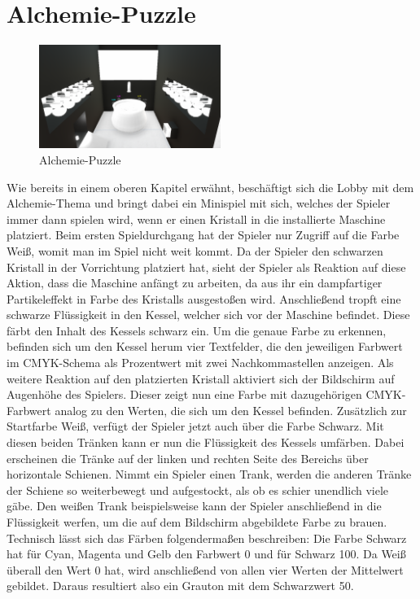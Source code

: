 \section{Alchemie-Puzzle}
\begin{figure}
	\vspace*{-0.5cm}
	\includegraphics[width=5.9cm]{Pictures/Alchemie}
	\caption{Alchemie-Puzzle}
	\vspace*{-0.5cm}
	\label{fig:alchemie_start}
\end{figure}
Wie bereits in einem oberen Kapitel erwähnt, beschäftigt sich die Lobby mit dem Alchemie-Thema und bringt dabei ein Minispiel mit sich, welches der Spieler immer dann spielen wird, wenn er einen Kristall in die installierte Maschine platziert. Beim ersten Spieldurchgang hat der Spieler nur Zugriff auf die Farbe Weiß, womit man im Spiel nicht weit kommt. Da der Spieler den schwarzen Kristall in der Vorrichtung platziert hat, sieht der Spieler als Reaktion auf diese Aktion, dass die Maschine anfängt zu arbeiten, da aus ihr ein dampfartiger Partikeleffekt in Farbe des Kristalls ausgestoßen wird. Anschließend tropft eine schwarze Flüssigkeit in den Kessel, welcher sich vor der Maschine befindet. Diese färbt den Inhalt des Kessels schwarz ein. Um die genaue Farbe zu erkennen, befinden sich um den Kessel herum vier Textfelder, die den jeweiligen Farbwert im CMYK-Schema als Prozentwert mit zwei Nachkommastellen anzeigen. Als weitere Reaktion auf den platzierten Kristall aktiviert sich der Bildschirm auf Augenhöhe des Spielers. Dieser zeigt nun eine Farbe mit dazugehörigen CMYK-Farbwert analog zu den Werten, die sich um den Kessel befinden. Zusätzlich zur Startfarbe Weiß, verfügt der Spieler jetzt auch über die Farbe Schwarz. Mit diesen beiden Tränken kann er nun die Flüssigkeit des Kessels umfärben. Dabei erscheinen die Tränke auf der linken und rechten Seite des Bereichs über horizontale Schienen. Nimmt ein Spieler einen Trank, werden die anderen Tränke der Schiene so weiterbewegt und aufgestockt, als ob es schier unendlich viele gäbe. Den weißen Trank beispielsweise kann der Spieler anschließend in die Flüssigkeit werfen, um die auf dem Bildschirm abgebildete Farbe zu brauen. Technisch lässt sich das Färben folgendermaßen beschreiben: Die Farbe Schwarz hat für Cyan, Magenta und Gelb den Farbwert 0 und für Schwarz 100. Da Weiß überall den Wert 0 hat, wird anschließend von allen vier Werten der Mittelwert gebildet. Daraus resultiert also ein Grauton mit dem Schwarzwert 50.\\
